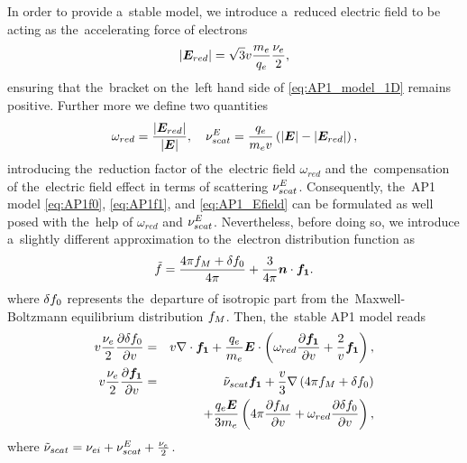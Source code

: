 In order to provide a~stable model, we introduce a~reduced electric field
to be acting as the~accelerating force of electrons
\begin{equation}
  |\boldsymbol{E}_{red}| = \sqrt{3} v\frac{m_e}{q_e}\frac{\nu_{e}}{2} ,
  \label{eq:Elimit}
\end{equation}
ensuring that the~bracket on the~left hand side of \eqref{eq:AP1_model_1D}
remains positive. Further more we define two quantities
\begin{equation}
  \omega_{red} = \frac{|\boldsymbol{E}_{red}|}{|\boldsymbol{E}|} ,\quad 
  \nu_{scat}^E = \frac{q_e}{m_ev} \left(|\boldsymbol{E}| - |\boldsymbol{E}_{red}|\right),
  \nonumber
\end{equation}
introducing the~reduction factor of the~electric field
$\omega_{red}$ and the~compensation of the~electric field effect in terms of
scattering $\nu_{scat}^E$. Consequently, the~AP1 model \eqref{eq:AP1f0}, 
\eqref{eq:AP1f1}, and \eqref{eq:AP1_Efield} can be formulated as well posed 
with the~help of $\omega_{red}$ and $\nu_{scat}^E$. Nevertheless, before doing so,
we introduce a~slightly different approximation to the~electron distribution 
function as
\begin{equation}
  \tilde{f} = \frac{4\pi f_M + \delta f_0}{4\pi} + \frac{3}{4\pi}\boldsymbol{n}\cdot\boldsymbol{f_1} .
  \label{eq:P1_OOE}
\end{equation}
where $\delta f_0$ represents the~departure of isotropic part from 
the~Maxwell-Boltzmann equilibrium distribution $f_M$. 
Then, the~stable AP1 model reads
\begin{eqnarray}
  v \frac{\nu_{e}}{2}\frac{\partial{\delta f_0}}{\partial{v}} &=&
  v\nabla\cdot\boldsymbol{f_1} 
  + \frac{q_e}{m_e}\boldsymbol{E}\cdot\left(\omega_{red} \frac{\partial{\boldsymbol{f_1}}}{\partial{v}} 
  + \frac{2}{v}\boldsymbol{f_1}\right) , 
  \label{eq:AP1f0_stable}\\
  v\frac{\nu_{e}}{2}\frac{\partial{\boldsymbol{f_1}}}{\partial{v}} 
  &=& \tilde{\nu}_{scat}\boldsymbol{f_1} 
  + \frac{v}{3}\nabla\left(4\pi f_M + \delta f_0\right)
  \nonumber \\
  && 
  + \frac{q_e\boldsymbol{E}}{3m_e}\left(4\pi \frac{\partial{f_M}}{\partial{v}} 
  + \omega_{red} \frac{\partial{\delta f_0}}{\partial{v}} 
  \right) ,
  \label{eq:AP1f1_stable}
\end{eqnarray}
where $\tilde{\nu}_{scat} = \nu_{ei} + \nu_{scat}^E + \frac{\nu_{e}}{2}$.

